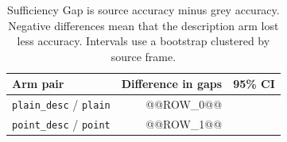 \begin{table}[ht]
\centering
\caption[Description comparisons in Sufficiency Gap]{Sufficiency Gap is source
accuracy minus grey accuracy. Negative differences mean that the description
arm lost less accuracy. Intervals use a bootstrap clustered by source frame.}
\label{tab:rq1-sufficiency}
\begin{tabular}{L{4.0cm}rr}
\toprule
Arm pair & Difference in gaps & 95\% CI \\
\midrule
\texttt{plain\_desc} / \texttt{plain} & @@ROW_0@@ \\
\texttt{point\_desc} / \texttt{point} & @@ROW_1@@ \\
\bottomrule
\end{tabular}
\end{table}
